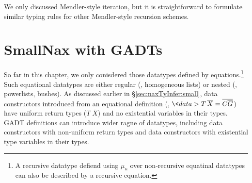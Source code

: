 We only discussed Mendler-style iteration, but it is straightforward to
formulate similar typing rules for other Mendler-style recursion schemes.

\section{SmallNax with GADTs}
\label{sec:naxTyInfer:gadt}
So far in this chapter, we only conisdered those datatypes defined
by equations.\footnote{A recursive datatype defiend using $\mu_\kappa$
over non-recursive equatinal datatypes can also be described by
a recursive equation.} Such equational datatypes are either regular
(\eg, homogeneous lists) or nested (\eg, powerlists, bushes).
As discussed earlier in \S\ref{sec:naxTyInfer:small}, data constructors
introduced from an equational definition
(\ie, $\<data> T\,\overline{X} = \overline{C \overline{G}}$) have
uniform return types ($T\;\overline{X}$) and no existential variables
in their types. GADT definitions can introduce wider ragne of datatypes,
including data constructors with non-uniform return types and data constructors
with existential type variables in their types.

